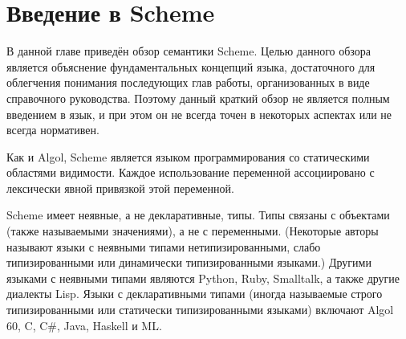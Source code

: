 \chapter{Введение в Scheme}
\label{semanticchapter}

В данной главе приведён обзор семантики Scheme. Целью данного обзора является объяснение
фундаментальных концепций языка, достаточного для облегчения понимания последующих глав работы,
организованных в виде справочного руководства. Поэтому данный краткий обзор не является полным
введением в язык, и при этом он не всегда точен в некоторых аспектах или не всегда нормативен.

Как и Algol, Scheme является языком программирования со статическими областями
видимости. Каждое использование переменной ассоциировано с лексически явной
привязкой этой переменной.

\vest Scheme имеет неявные, а не декларативные, типы\cite{WaiteGoos}. Типы связаны с
объектами (также называемыми значениями), а не с переменными. (Некоторые
авторы называют языки с неявными типами нетипизированными, слабо типизированными или динамически
типизированными языками.) Другими языками с неявными типами являются Python, Ruby, Smalltalk, а
также другие диалекты Lisp. Языки с декларативными типами (иногда называемые строго
типизированными или статически типизированными языками) включают Algol 60, C, C\#, Java, Haskell
и ML.

